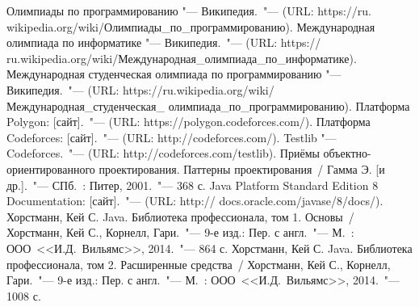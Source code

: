 \renewcommand{\bibname}{Список использованных источников}
\begin{thebibliography}{99}
 Олимпиады по программированию "--- Википедия.~"--- (URL: https://ru. wikipedia.org/wiki/Олимпиады\_по\_программированию).
 Международная олимпиада по информатике "--- Википедия.~"--- (URL: https:// ru.wikipedia.org/wiki/Международная\_олимпиада\_по\_информатике).
 Международная студенческая олимпиада по программированию "--- Википедия.~"--- (URL: https://ru.wikipedia.org/wiki/Международная\_студенческая\_ олимпиада\_по\_про\-грам\-ми\-рованию).
 Платформа Polygon: [сайт].~"--- (URL: https://polygon.codeforces.com/).
 Платформа Codeforces: [сайт].~"--- (URL: http://codeforces.com/).
 Testlib "--- Codeforces.~"--- (URL: http://codeforces.com/testlib).
 Приёмы объектно-ориентированного проектирования. Паттерны проектирования~/ Гамма Э. [и др.].~"--- СПб.~: Питер, 2001.~"--- 368 с.
 Java Platform Standard Edition 8 Documentation: [сайт].~"--- (URL: http:// docs.oracle.com/javase/8/docs/).
 Хорстманн, Кей С. Java. Библиотека профессионала, том 1. Основы~/ Хорстманн, Кей С., Корнелл, Гари.~"--- 9-е изд.: Пер. с англ.~"--- М.~: ООО~<<И.Д.~Вильямс>>, 2014.~"--- 864 с.
 Хорстманн, Кей С. Java. Библиотека профессионала, том 2. Расширенные средства~/ Хорстманн, Кей С., Корнелл, Гари.~"--- 9-е изд.: Пер. с англ.~"--- М.~: ООО~<<И.Д.~Вильямс>>, 2014.~"--- 1008 с.
\end{thebibliography}